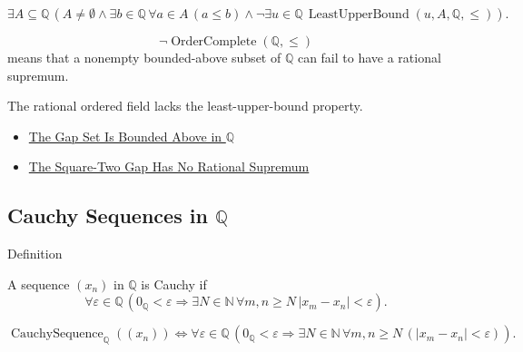 \begin{remark*}
\[
\exists A\subseteq\mathbb{Q}\,
\left(A\ne\emptyset
\land \exists b\in\mathbb{Q}\,\forall a\in A\,(a\le b)
\land \neg\exists u\in\mathbb{Q}\,\operatorname{LeastUpperBound}(u,A,\mathbb{Q},\le)\right).
\]
\end{remark*}

\begin{remark*}
\[
\neg\operatorname{OrderComplete}(\mathbb{Q},\le)
\]
means that a nonempty bounded-above subset of $\mathbb{Q}$ can fail to have a rational supremum.
\end{remark*}

\begin{remark*}[Interpretation]
The rational ordered field lacks the least-upper-bound property.
\end{remark*}

\begin{dependencies}
\begin{itemize}
  \item \hyperref[prop:gap-set-bounded-above-q]{The Gap Set Is Bounded Above in $\mathbb{Q}$}
  
\item \hyperref[thm:gap-set-no-rational-supremum-q]{The Square-Two Gap Has No Rational Supremum}
\end{itemize}
\end{dependencies}

\subsection*{\texorpdfstring{Cauchy Sequences in $\mathbb{Q}$}{Cauchy Sequences in Q}}

\begin{definitionbox}{Definition}
\begin{definition}
\label{def:cauchy-sequence-in-q}
A sequence $(x_n)$ in $\mathbb{Q}$ is Cauchy if
\[
\forall\varepsilon\in\mathbb{Q}\,
\left(
0_{\mathbb{Q}}<\varepsilon
\Longrightarrow
\exists N\in\mathbb{N}\,
\forall m,n\ge N\,
\left|x_m-x_n\right|<\varepsilon
\right).
\]
\end{definition}
\end{definitionbox}

\begin{remark*}
\[
\operatorname{CauchySequence}_{\mathbb{Q}}((x_n))
\Longleftrightarrow
\forall\varepsilon\in\mathbb{Q}\,
\left(0_{\mathbb{Q}}<\varepsilon
\Longrightarrow
\exists N\in\mathbb{N}\,
\forall m,n\ge N\,(\left|x_m-x_n\right|<\varepsilon)\right).
\]
\end{remark*}

